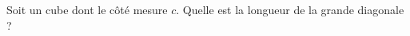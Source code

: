 
\begin{exercice}\label{exosmath-0114}

    Soit un cube dont le côté mesure \( c\). Quelle est la longueur de la grande diagonale ?

\end{exercice}
